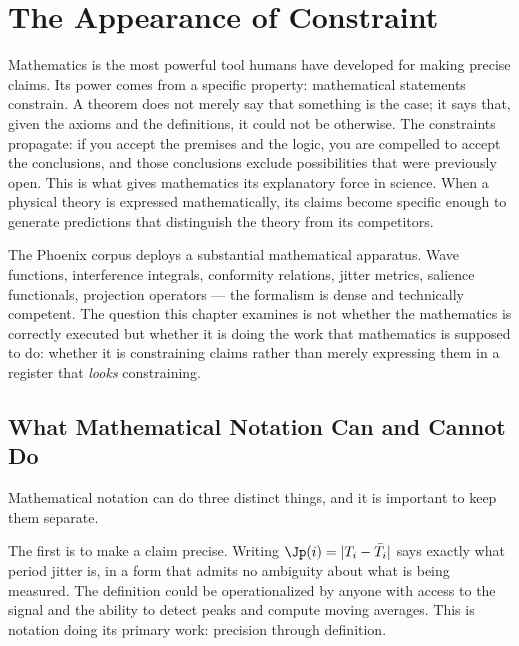 
\chapter{The Appearance of Constraint}
\label{ch:decorative-formalism}


\noindent
Mathematics is the most powerful tool humans have developed for
making precise claims. Its power comes from a specific property:
mathematical statements constrain. A theorem does not merely say
that something is the case; it says that, given the axioms and the
definitions, it could not be otherwise. The constraints propagate:
if you accept the premises and the logic, you are compelled to
accept the conclusions, and those conclusions exclude possibilities
that were previously open. This is what gives mathematics its
explanatory force in science. When a physical theory is expressed
mathematically, its claims become specific enough to generate
predictions that distinguish the theory from its competitors.

The Phoenix corpus deploys a substantial mathematical apparatus.
Wave functions, interference integrals, conformity relations,
jitter metrics, salience functionals, projection operators ---
the formalism is dense and technically competent. The question
this chapter examines is not whether the mathematics is correctly
executed but whether it is doing the work that mathematics is
supposed to do: whether it is constraining claims rather than
merely expressing them in a register that \textit{looks}
constraining.

\section{What Mathematical Notation Can and Cannot Do}
\label{sec:notation-function}

Mathematical notation can do three distinct things, and it is
important to keep them separate.

The first is to make a claim precise. Writing $\Jp(i) =
|T_i - \bar{T}_i|$ says exactly what period jitter is,
in a form that admits no ambiguity about what is being
measured. The definition could be operationalized by
anyone with access to the signal and the ability to detect
peaks and compute moving averages. This is notation doing
its primary work: precision through definition.

